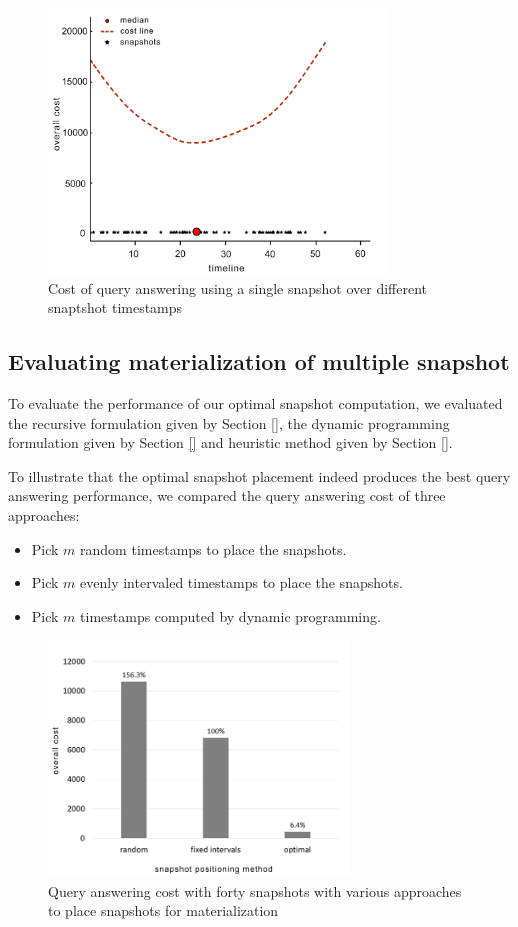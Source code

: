 			\begin{figure}
				\centering
				\includegraphics[width=90mm]{figs/single_snapshot.jpg}
				\caption{Cost of query answering using a single snapshot over different snaptshot timestamps}
				\label{fig:single_snapshot}
			\end{figure} 

		\subsection{Evaluating materialization of multiple snapshot} \label{evaluating_multiple_snapshots}
			To evaluate the performance of our optimal snapshot computation, we evaluated the recursive formulation given
			by Section \ref{}, the dynamic programming formulation given by Section \ref{} and heuristic method given by Section \ref{}. 

			To illustrate that the optimal snapshot placement indeed produces the best query answering performance, we compared the query answering cost of three approaches:
			\begin{itemize}
				\item Pick $m$ random timestamps to place the snapshots.
				\item Pick $m$ evenly intervaled timestamps to place the snapshots.
				\item Pick $m$ timestamps computed by dynamic programming.
			\end{itemize}

			\begin{figure}
				\centering
				\includegraphics[width=80mm]{figs/various_scenarios_cost.jpg}
				\caption{Query answering cost with forty snapshots with various approaches to place snapshots for materialization}
				\label{fig:approaches_cost}
			\end{figure} 

